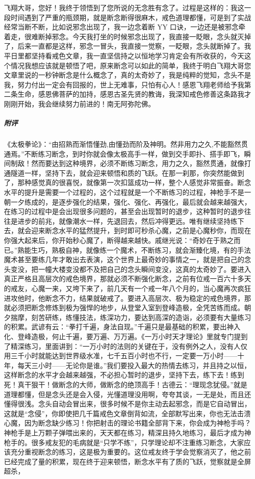 \begin{case}
    飞翔大哥，您好！我终于领悟到了您所说的无念胜有念了。过程是这样的：我这一段时间遇到了严重的瓶颈期，就是断念断得很麻木，戒色道理都懂，可是到了实战经常当断不断，比如说邪念出现了，我一边念着断 YY 口诀，一边还是被邪念牵着走，很难断掉邪念。今天我打坐的时候邪念出现了，我直接一眨眼，念头就灭掉了，后来一直都是这样，邪念一冒头，我直接一觉察，一眨眼，念头就断掉了。我平日里都坚持看戒色文章，我一直坚信持之以恒地学习肯定会有所收获的，今天这个情况我想应该就是顿悟了吧，原来断念可以如此的简单，我终于明白飞翔大哥您文章里说的一秒钟断念是什么概念了，真的太奇妙了，我是纯粹的觉知，念头不是我，努力付出一定会有回报的，世上无难事，只怕有心人！感恩飞翔老师给予我第二条生命，感恩佛菩萨的加持，感恩古圣先贤的教诲，我深知戒色修善这条路我才刚刚开始，我会继续努力前进的！南无阿弥陀佛。
    \subparagraph{附评} 《太极拳论》：“由招熟而渐悟懂劲,由懂劲而阶及神明。然非用力之久,不能豁然贯通焉。”不断练习断念，到时你就会像太极高手一样，做到交手即扑、搭手即飞，瞬间制敌！然而要达到这种境界，必须不断练习断念，用力之久，豁然贯通，就像打通隧道一样，坚持下去，就会迎来顿悟和质的飞跃。在那一刹那，你突然能做到了，那种感觉真的很喜悦，就像第一次扣篮成功一样，整个人感觉非常振奋。断念水平的提升是需要一个过程的，这个过程就是一个不断练习的过程，神枪手不是一朝一夕练成的，是逐步强化的结果，强化、强化、再强化，最后就会越来越强大，在练习的过程中是会出现很多问题的，甚至会出现暂时的退步，这种暂时的退步往往是进步的前兆，就像潮水一样，先退回去，然后冲得更远。唯有继续坚持练下去，就会迎来断念水平的猛然提升，到时即可秒杀心魔，之前是心魔秒你，而现在你强大起来后，你开始秒心魔了，断得越来越快。戚继光说：“奇妙在于熟之而已。”熟能生巧，熟极自神，就像练一个魔术，不断练习，就会渐臻化境，有的手法魔术甚至要练几年才敢出去表演，这个世界上最奇妙的事情之一，就是把自己的念头变没，把一幢大楼变没都不及把自己的念头瞬间变没，这真的太奇妙了。要进入真正严格且高层次的戒色境界，那就必须不断强化断念，之前有位戒一百六十多天的戒友，心魔一来，又垮下来了，前几天有一个戒一年八个月的，当心魔再次疯狂进攻他时，他断念不力，结果就破戒了。要进入高层次、极为稳定的戒色境界，那就必须把断念修炼到极为强悍的地步，从登堂入室到登峰造极，全凭苦练而成。朝夕揣摩，刻苦研练，练懂技法，练深功力，要达到高深的造诣，必须要有大量练习的积累。武谚有云：“拳打千遍，身法自现。”千遍只是最基础的积累，要出神入化、登峰造极，何止千遍，要万遍、万万遍。《一万小时天才理论》里就专门提到了精深练习，里面讲到：“一万小时的法则的关键在于，没有例外之人，没有人仅用三千小时就能达到世界级水准，七千五百小时也不行，一定要一万小时——十年，每天三小时——无论你是谁。”我们要投入最大的热情去练习，并且持之以恒，这样断念的水平才会越来越强，不必担心暂时的退步，坚持下去，练下去！练到死！真干狠干！做断念的大师，做断念的绝顶高手！古德云：“理现念犹侵。”就是道理都懂，但是念头还是会入侵，光懂道理没用啊，夸夸其谈，一无是处，而且还懂得很浅。念头自动会冒出来，很多时候不是你主动去起邪念，而是它自动冒出，这就是“念侵”，你即使把几千篇戒色文章倒背如流，全部默写出来，你也无法击溃心魔，因为断念缺少练习！你把射击的理论书籍全部背下来，你会成为神枪手吗？神枪手是上万颗子弹喂出来的，天天都在练习，精深且持久地练习，最后才成为神枪手的。很多戒友犯的毛病就是“只学不练”，只学理论却不注重练习断念，大家应该充分重视断念的练习，这是极为重要的。这位戒友终于学会觉察消灭了，他之前已经完成了量的积累，现在终于迎来顿悟，断念水平有了质的飞跃，觉察就是全屏超杀，
\end{case}
